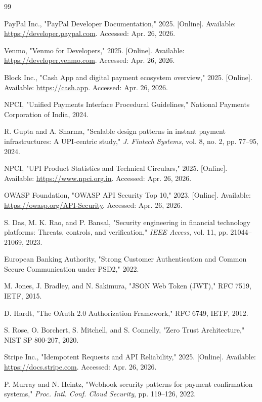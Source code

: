 \documentclass[conference]{IEEEtran}
\begin{document}
\begin{thebibliography}{99}

PayPal Inc., "PayPal Developer Documentation," 2025. [Online]. Available: \url{https://developer.paypal.com}. Accessed: Apr. 26, 2026.

Venmo, "Venmo for Developers," 2025. [Online]. Available: \url{https://developer.venmo.com}. Accessed: Apr. 26, 2026.

Block Inc., "Cash App and digital payment ecosystem overview," 2025. [Online]. Available: \url{https://cash.app}. Accessed: Apr. 26, 2026.

NPCI, "Unified Payments Interface Procedural Guidelines," National Payments Corporation of India, 2024.

R. Gupta and A. Sharma, "Scalable design patterns in instant payment infrastructures: A UPI-centric study," \emph{J. Fintech Systems}, vol. 8, no. 2, pp. 77--95, 2024.

NPCI, "UPI Product Statistics and Technical Circulars," 2025. [Online]. Available: \url{https://www.npci.org.in}. Accessed: Apr. 26, 2026.

OWASP Foundation, "OWASP API Security Top 10," 2023. [Online]. Available: \url{https://owasp.org/API-Security}. Accessed: Apr. 26, 2026.

S. Das, M. K. Rao, and P. Bansal, "Security engineering in financial technology platforms: Threats, controls, and verification," \emph{IEEE Access}, vol. 11, pp. 21044--21069, 2023.

European Banking Authority, "Strong Customer Authentication and Common Secure Communication under PSD2," 2022.

M. Jones, J. Bradley, and N. Sakimura, "JSON Web Token (JWT)," RFC 7519, IETF, 2015.

D. Hardt, "The OAuth 2.0 Authorization Framework," RFC 6749, IETF, 2012.

S. Rose, O. Borchert, S. Mitchell, and S. Connelly, "Zero Trust Architecture," NIST SP 800-207, 2020.

Stripe Inc., "Idempotent Requests and API Reliability," 2025. [Online]. Available: \url{https://docs.stripe.com}. Accessed: Apr. 26, 2026.

P. Murray and N. Heintz, "Webhook security patterns for payment confirmation systems," \emph{Proc. Intl. Conf. Cloud Security}, pp. 119--126, 2022.


\end{thebibliography}
\end{document}
